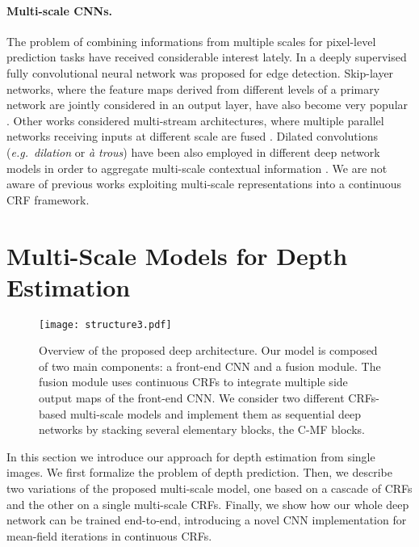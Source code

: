 \documentclass[10pt,twocolumn,letterpaper]{article}
\def\eg{\textit{e.g.}~}
\begin{document}
\paragraph{Multi-scale CNNs.} The problem of combining informations from multiple scales for pixel-level prediction
tasks have received considerable interest lately. In \cite{xie2015holistically} a deeply supervised fully convolutional neural 
network was proposed for edge detection. Skip-layer networks, where the feature maps derived from different
levels of a primary network are jointly considered in an output layer, have also become very popular
\cite{long2015fully,bertasius2015deepedge}. Other works considered multi-stream architectures, where
multiple parallel networks receiving inputs at different scale are fused \cite{buyssens2012multiscale}. Dilated
convolutions (\eg \textit{dilation} or \textit{\`{a} trous}) have been also employed in different deep network models in order to 
aggregate multi-scale contextual information \cite{chen2014semantic}.
We are not aware of previous works exploiting multi-scale representations into a continuous CRF framework.
 

\section{Multi-Scale Models for Depth Estimation}

\begin{figure*}[t]
\centering
\texttt{[image: structure3.pdf]} 
\caption{Overview of the proposed deep architecture. Our model is composed of two main components: a front-end CNN and 
a fusion module. The fusion module uses continuous CRFs to integrate multiple side output maps of the front-end CNN. 
We consider two different CRFs-based multi-scale models and implement them as sequential deep networks by 
stacking several elementary blocks, the C-MF blocks. }
\vspace{-0.4cm}
\label{framework}
\end{figure*}

In this section we introduce our approach 
for depth estimation from single images. We first formalize the problem of depth prediction. Then, we
describe two variations of the proposed multi-scale model, one based on a cascade of CRFs and the other on a 
single multi-scale CRFs. Finally, we show how our whole deep network can be trained end-to-end, introducing a 
novel CNN implementation for mean-field iterations in continuous CRFs.
\end{document}
